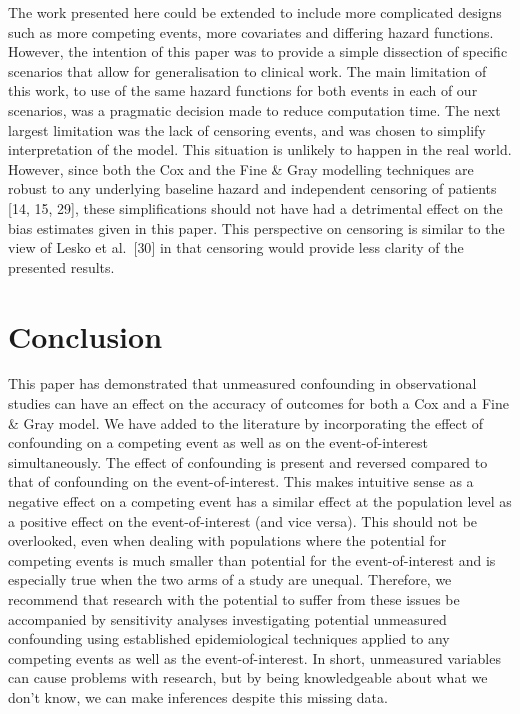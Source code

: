 \documentclass[12pt,PhD,twoside,openright]{muthesis}
\begin{document}
The work presented here could be extended to include more complicated designs such as more competing events, more covariates and differing hazard functions. However, the intention of this paper was to provide a simple dissection of specific scenarios that allow for generalisation to clinical work. The main limitation of this work, to use of the same hazard functions for both events in each of our scenarios, was a pragmatic decision made to reduce computation time. The next largest limitation was the lack of censoring events, and was chosen to simplify interpretation of the model. This situation is unlikely to happen in the real world. However, since both the Cox and the Fine \& Gray modelling techniques are robust to any underlying baseline hazard and independent censoring of patients {[}14, 15, 29{]}, these simplifications should not have had a detrimental effect on the bias estimates given in this paper. This perspective on censoring is similar to the view of Lesko et al.~{[}30{]} in that censoring would provide less clarity of the presented results.

\hypertarget{conclusion-1}{%
\section{Conclusion}\label{conclusion-1}}

This paper has demonstrated that unmeasured confounding in observational studies can have an effect on the accuracy of outcomes for both a Cox and a Fine \& Gray model. We have added to the literature by incorporating the effect of confounding on a competing event as well as on the event-of-interest simultaneously. The effect of confounding is present and reversed compared to that of confounding on the event-of-interest. This makes intuitive sense as a negative effect on a competing event has a similar effect at the population level as a positive effect on the event-of-interest (and vice versa). This should not be overlooked, even when dealing with populations where the potential for competing events is much smaller than potential for the event-of-interest and is especially true when the two arms of a study are unequal. Therefore, we recommend that research with the potential to suffer from these issues be accompanied by sensitivity analyses investigating potential unmeasured confounding using established epidemiological techniques applied to any competing events as well as the event-of-interest. In short, unmeasured variables can cause problems with research, but by being knowledgeable about what we don't know, we can make inferences despite this missing data.
\end{document}
